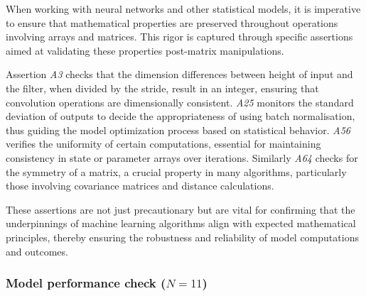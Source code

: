 When working with neural networks and other statistical models, it is imperative to ensure that mathematical properties are preserved throughout operations involving arrays and matrices. This rigor is captured through specific assertions aimed at validating these properties post-matrix manipulations.

Assertion \emph{A3} checks that the dimension differences between height of input and the filter, when divided by the stride, result in an integer, ensuring that convolution operations are dimensionally consistent. \emph{A25} monitors the standard deviation of outputs to decide the appropriateness of using batch normalisation, thus guiding the model optimization process based on statistical behavior. \emph{A56} verifies the uniformity of certain computations, essential for maintaining consistency in state or parameter arrays over iterations. Similarly \emph{A64} checks for the symmetry of a matrix, a crucial property in many algorithms, particularly those involving covariance matrices and distance calculations. 

These assertions are not just precautionary but are vital for confirming that the underpinnings of machine learning algorithms align with expected mathematical principles, thereby ensuring the robustness and reliability of model computations and outcomes.

\subsubsection{Model performance check ($N = 11$)}

